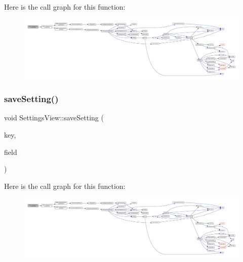 Here is the call graph for this function\+:
\nopagebreak
\begin{figure}[H]
\begin{center}
\leavevmode
\includegraphics[width=350pt]{class_q_g_b_a_1_1_settings_view_a853addf508746b4eb3f5c7ea2233c509_cgraph}
\end{center}
\end{figure}
\mbox{\label{class_q_g_b_a_1_1_settings_view_a3c2ad8120a1ce6d9a3c6ed0202ebc6dd}} 
\subsubsection{\texorpdfstring{save\+Setting()}{saveSetting()}\hspace{0.1cm}{\footnotesize\ttfamily [6/7]}}
{\footnotesize\ttfamily void Settings\+View\+::save\+Setting (\begin{DoxyParamCaption}\item[{const char $\ast$}]{key,  }\item[{const Q\+Spin\+Box $\ast$}]{field }\end{DoxyParamCaption})\hspace{0.3cm}{\ttfamily [private]}}

Here is the call graph for this function\+:
\nopagebreak
\begin{figure}[H]
\begin{center}
\leavevmode
\includegraphics[width=350pt]{class_q_g_b_a_1_1_settings_view_a3c2ad8120a1ce6d9a3c6ed0202ebc6dd_cgraph}
\end{center}
\end{figure}
\mbox{\label{class_q_g_b_a_1_1_settings_view_afcd43696948628ead551449451d2c0f6}} 
